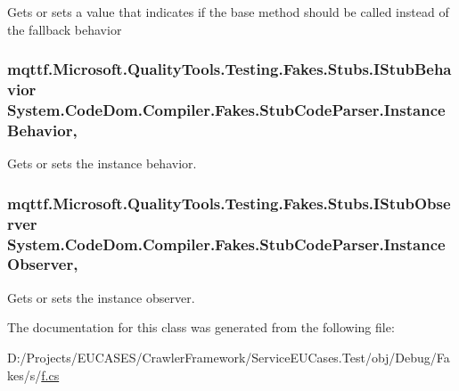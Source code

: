 Gets or sets a value that indicates if the base method should be called instead of the fallback behavior

\hypertarget{class_system_1_1_code_dom_1_1_compiler_1_1_fakes_1_1_stub_code_parser_aa9bfc3ab46538176df839096cf4edfbd}{
\subsubsection[{Instance\-Behavior}]{\setlength{\rightskip}{0pt plus 5cm}mqttf.\-Microsoft.\-Quality\-Tools.\-Testing.\-Fakes.\-Stubs.\-I\-Stub\-Behavior System.\-Code\-Dom.\-Compiler.\-Fakes.\-Stub\-Code\-Parser.\-Instance\-Behavior\hspace{0.3cm}{\ttfamily [get]}, {\ttfamily [set]}}}\label{class_system_1_1_code_dom_1_1_compiler_1_1_fakes_1_1_stub_code_parser_aa9bfc3ab46538176df839096cf4edfbd}


Gets or sets the instance behavior.

\hypertarget{class_system_1_1_code_dom_1_1_compiler_1_1_fakes_1_1_stub_code_parser_a179da3663be604b6c2e99140cb8d6b57}{
\subsubsection[{Instance\-Observer}]{\setlength{\rightskip}{0pt plus 5cm}mqttf.\-Microsoft.\-Quality\-Tools.\-Testing.\-Fakes.\-Stubs.\-I\-Stub\-Observer System.\-Code\-Dom.\-Compiler.\-Fakes.\-Stub\-Code\-Parser.\-Instance\-Observer\hspace{0.3cm}{\ttfamily [get]}, {\ttfamily [set]}}}\label{class_system_1_1_code_dom_1_1_compiler_1_1_fakes_1_1_stub_code_parser_a179da3663be604b6c2e99140cb8d6b57}


Gets or sets the instance observer.



The documentation for this class was generated from the following file\-:\begin{DoxyCompactItemize}
\item 
D\-:/\-Projects/\-E\-U\-C\-A\-S\-E\-S/\-Crawler\-Framework/\-Service\-E\-U\-Cases.\-Test/obj/\-Debug/\-Fakes/s/\hyperlink{s_2f_8cs}{f.\-cs}\end{DoxyCompactItemize}
